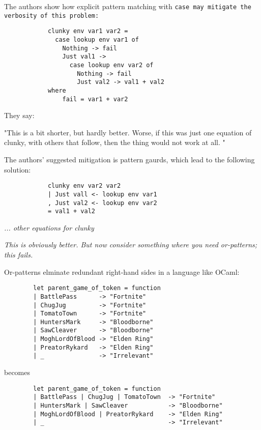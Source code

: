 \documentclass[manuscript,screen,review, 12pt]{acmart}
\begin{document}
        The authors show how explicit pattern matching with \tt{case} may mitigate the
        verbosity of this problem:
        
        \begin{verbatim}
            clunky env var1 var2 = 
              case lookup env var1 of 
                Nothing -> fail 
                Just val1 -> 
                  case lookup env var2 of 
                    Nothing -> fail 
                    Just val2 -> val1 + val2
            where 
                fail = var1 + var2
        \end{verbatim}
        
        They say: 
        
        "This is a bit shorter, but hardly better. Worse, if this was just one equation
        of clunky, with others that follow, then the thing would not work at all. " 
        
        The authors' suggested mitigation is pattern gaurds, which lead to the following
        solution: 
        \begin{center}
        \begin{verbatim}
            clunky env var2 var2    
            | Just vall <- lookup env var1
            , Just val2 <- lookup env var2
            = val1 + val2
        \end{verbatim}
        \it{... other equations for clunky}
        \end{center}    
        
        \it{This is obviously better. But now consider something where you need 
        or-patterns; this fails. }

        Or-patterns elminate redundant right-hand sides in a language like
        OCaml: 

    \begin{center}
    \begin{verbatim}
        let parent_game_of_token = function 
        | BattlePass      -> "Fortnite"
        | ChugJug         -> "Fortnite"
        | TomatoTown      -> "Fortnite"
        | HuntersMark     -> "Bloodborne"
        | SawCleaver      -> "Bloodborne"
        | MoghLordOfBlood -> "Elden Ring"
        | PreatorRykard   -> "Elden Ring"
        | _               -> "Irrelevant"
    \end{verbatim}
    \end{center}    

            becomes 

    \begin{center}
    \begin{verbatim}
        let parent_game_of_token = function 
        | BattlePass | ChugJug | TomatoTown  -> "Fortnite"
        | HuntersMark | SawCleaver           -> "Bloodborne"
        | MoghLordOfBlood | PreatorRykard    -> "Elden Ring"
        | _                                  -> "Irrelevant"
    \end{verbatim}
    \end{center}    
\end{document}
